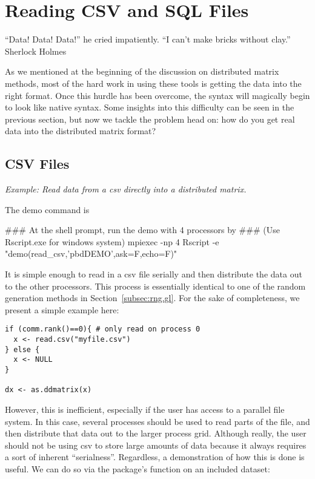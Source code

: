 \chapter[Readers]{Reading CSV and SQL Files}
\label{sec:reader}


\inspire%
{``Data! Data! Data!'' he cried impatiently. ``I can't make bricks without clay.''}%
{Sherlock Holmes}
\vspace{0.5cm}


As we mentioned at the beginning of the discussion on distributed matrix methods, most of the hard work in using these tools is getting the data into the right format.  Once this hurdle has been overcome, the syntax will magically begin to look like native  syntax.  Some insights into this difficulty can be seen in the previous section, but now we tackle the problem head on:  how do you get real data into the distributed matrix format?

\section{CSV Files}
\label{sec:csv_files}

\emph{Example:  Read data from a csv directly into a distributed matrix.}

The demo command is
\begin{Command}
### At the shell prompt, run the demo with 4 processors by
### (Use Rscript.exe for windows system)
mpiexec -np 4 Rscript -e "demo(read_csv,'pbdDEMO',ask=F,echo=F)"
\end{Command}

It is simple enough to read in a csv file serially and then distribute the data out to the other processors.  This process is essentially identical to one of the random generation methods in Section~\ref{subsec:rng.gl}.  For the sake of completeness, we present a simple example here:

\begin{lstlisting}[language=rr]
if (comm.rank()==0){ # only read on process 0
  x <- read.csv("myfile.csv")
} else {
  x <- NULL
}

dx <- as.ddmatrix(x)
\end{lstlisting}

However, this is inefficient, especially if the user has access to a parallel file system.  In this case, several processes should be used to read parts of the file, and then distribute that data out to the larger process grid.  Although really, the user should not be using csv to store large amounts of data because it always requires a sort of inherent ``serialness''.  Regardless, a demonstration of how this is done is useful.  We can do so via the  package's function  on an included dataset:


